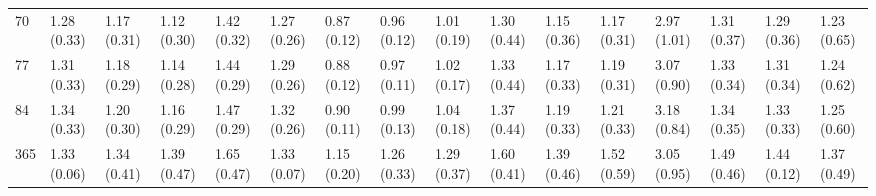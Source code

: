 \begin{tabular}{llllllllllllllll}
70  &  1.28 (0.33) &  1.17 (0.31) &  1.12 (0.30) &  1.42 (0.32) &  1.27 (0.26) &  0.87 (0.12) &  0.96 (0.12) &  1.01 (0.19) &  1.30 (0.44) &  1.15 (0.36) &  1.17 (0.31) &  2.97 (1.01) &  1.31 (0.37) &  1.29 (0.36) &  1.23 (0.65) \\
77  &  1.31 (0.33) &  1.18 (0.29) &  1.14 (0.28) &  1.44 (0.29) &  1.29 (0.26) &  0.88 (0.12) &  0.97 (0.11) &  1.02 (0.17) &  1.33 (0.44) &  1.17 (0.33) &  1.19 (0.31) &  3.07 (0.90) &  1.33 (0.34) &  1.31 (0.34) &  1.24 (0.62) \\
84  &  1.34 (0.33) &  1.20 (0.30) &  1.16 (0.29) &  1.47 (0.29) &  1.32 (0.26) &  0.90 (0.11) &  0.99 (0.13) &  1.04 (0.18) &  1.37 (0.44) &  1.19 (0.33) &  1.21 (0.33) &  3.18 (0.84) &  1.34 (0.35) &  1.33 (0.33) &  1.25 (0.60) \\
365 &  1.33 (0.06) &  1.34 (0.41) &  1.39 (0.47) &  1.65 (0.47) &  1.33 (0.07) &  1.15 (0.20) &  1.26 (0.33) &  1.29 (0.37) &  1.60 (0.41) &  1.39 (0.46) &  1.52 (0.59) &  3.05 (0.95) &  1.49 (0.46) &  1.44 (0.12) &  1.37 (0.49) \\
\bottomrule
\end{tabular}
